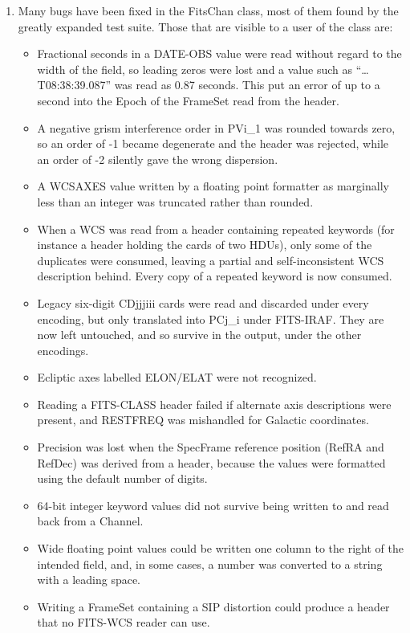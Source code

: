 \documentclass[twoside,11pt]{starlink}
\begin{document}
\begin{enumerate}
\item Many bugs have been fixed in the FitsChan class, most of them found by the greatly expanded test suite.
  Those that are visible to a user of the class are:

  \begin{itemize}
  \item Fractional seconds in a DATE-OBS value were read without regard to the width of the field, so leading zeros were lost and a value such as ``\ldots{}T08:38:39.087'' was read as 0.87 seconds.
    This put an error of up to a second into the Epoch of the FrameSet read from the header.
  \item A negative grism interference order in PVi\_1 was rounded towards zero, so an order of -1 became degenerate and the header was rejected, while an order of -2 silently gave the wrong dispersion.
  \item A WCSAXES value written by a floating point formatter as marginally less than an integer was truncated rather than rounded.
  \item When a WCS was read from a header containing repeated keywords (for instance a header holding the cards of two HDUs), only some of the duplicates were consumed, leaving a partial and self-inconsistent WCS description behind.
    Every copy of a repeated keyword is now consumed.
  \item Legacy six-digit CDjjjiii cards were read and discarded under every encoding, but only translated into PCj\_i under FITS-IRAF.
    They are now left untouched, and so survive in the output, under the other encodings.
  \item Ecliptic axes labelled ELON/ELAT were not recognized.
  \item Reading a FITS-CLASS header failed if alternate axis descriptions were present, and RESTFREQ was mishandled for Galactic coordinates.
  \item Precision was lost when the SpecFrame reference position (RefRA and RefDec) was derived from a header, because the values were formatted using the default number of digits.
  \item 64-bit integer keyword values did not survive being written to and read back from a Channel.
  \item Wide floating point values could be written one column to the right of the intended field, and, in some cases, a number was converted to a string with a leading space.
  \item Writing a FrameSet containing a SIP distortion could produce a header that no FITS-WCS reader can use.

\end{itemize}
\end{enumerate}
\end{document}
